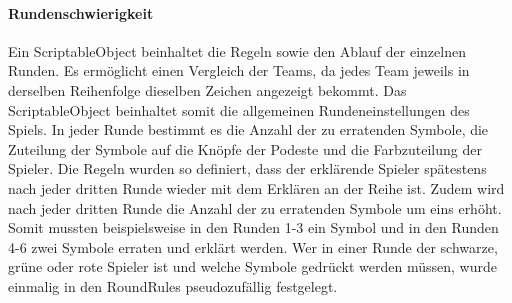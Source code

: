 \documentclass[a4paper,11pt]{article}%
\renewcommand{\\}{\vspace*{0.5\baselineskip} \newline}
\begin{document}
\paragraph{Rundenschwierigkeit}
Ein ScriptableObject beinhaltet die Regeln sowie den Ablauf der einzelnen Runden. Es ermöglicht einen Vergleich der Teams, da jedes Team jeweils in derselben Reihenfolge dieselben Zeichen angezeigt bekommt. Das ScriptableObject beinhaltet somit die allgemeinen Rundeneinstellungen des Spiels. In jeder Runde bestimmt es die Anzahl der zu erratenden Symbole, die Zuteilung der Symbole auf die Knöpfe der Podeste und die Farbzuteilung der Spieler. Die Regeln wurden so definiert, dass der erklärende Spieler spätestens nach jeder dritten Runde wieder mit dem Erklären an der Reihe ist. Zudem wird nach jeder dritten Runde die Anzahl der zu erratenden Symbole um eins erhöht. Somit mussten beispielsweise in den Runden 1-3 ein Symbol und in den Runden 4-6 zwei Symbole erraten und erklärt werden. Wer in einer Runde der schwarze, grüne oder rote Spieler ist und welche Symbole gedrückt werden müssen, wurde einmalig in den RoundRules pseudozufällig festgelegt.
\end{document}
